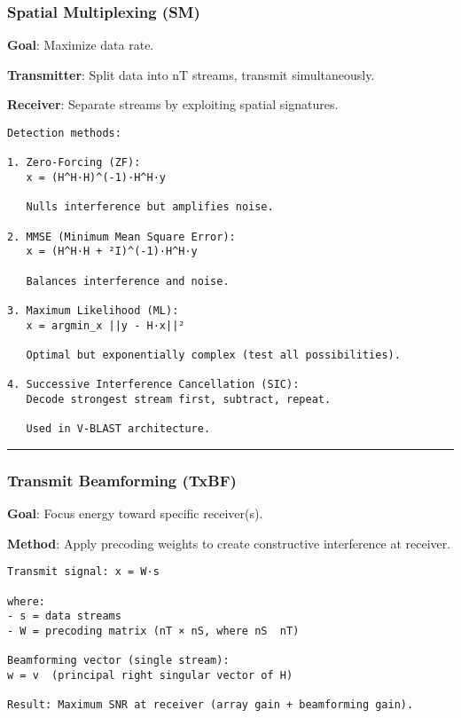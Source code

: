 \subsubsection{Spatial Multiplexing (SM)}\label{spatial-multiplexing-sm}

\textbf{Goal}: Maximize data rate.

\textbf{Transmitter}: Split data into nT streams, transmit
simultaneously.

\textbf{Receiver}: Separate streams by exploiting spatial signatures.

\begin{verbatim}
Detection methods:

1. Zero-Forcing (ZF):
   x = (H^H·H)^(-1)·H^H·y
   
   Nulls interference but amplifies noise.

2. MMSE (Minimum Mean Square Error):
   x = (H^H·H + ²I)^(-1)·H^H·y
   
   Balances interference and noise.

3. Maximum Likelihood (ML):
   x = argmin_x ||y - H·x||²
   
   Optimal but exponentially complex (test all possibilities).

4. Successive Interference Cancellation (SIC):
   Decode strongest stream first, subtract, repeat.
   
   Used in V-BLAST architecture.
\end{verbatim}

\begin{center}\rule{0.5\linewidth}{0.5pt}\end{center}

\subsubsection{Transmit Beamforming
(TxBF)}\label{transmit-beamforming-txbf}

\textbf{Goal}: Focus energy toward specific receiver(s).

\textbf{Method}: Apply precoding weights to create constructive
interference at receiver.

\begin{verbatim}
Transmit signal: x = W·s

where:
- s = data streams
- W = precoding matrix (nT × nS, where nS  nT)

Beamforming vector (single stream):
w = v  (principal right singular vector of H)

Result: Maximum SNR at receiver (array gain + beamforming gain).
\end{verbatim}

